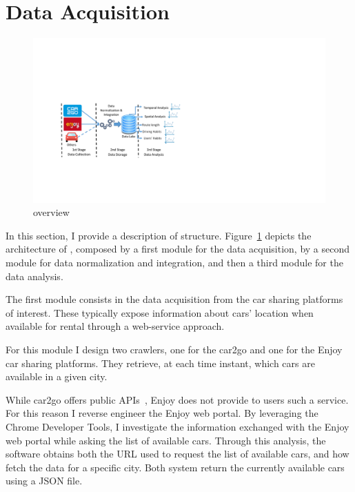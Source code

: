 \section{Data Acquisition}
\label{sec:2_3_data_acquisition}
\begin{figure}[h!]
\centering
 \includegraphics[trim=3cm 4.5cm 17cm 7.2cm,clip, width=0.95\columnwidth]{figures/framework_schema.pdf}
 \caption{\tool overview\label{fig:2_3_c2_framework}}
\end{figure}


In this section, I provide a description of \tool structure. Figure~\ref{fig:2_3_c2_framework} depicts the architecture of \tool, composed by a first module for the data acquisition, by a second module for data normalization and integration, and then a third  module for the data analysis.

The first module consists in the data acquisition from the car sharing platforms of interest. These typically expose information about cars' location when available for rental through a web-service approach. 

For this module I design two crawlers, one for the car2go and one for the Enjoy car sharing platforms. They retrieve, at each time instant, which cars are available in a given city.

While car2go offers public APIs~\cite{car2goAPI}, Enjoy does not provide to users such a service. For this reason I reverse engineer the Enjoy web portal. By leveraging the Chrome Developer Tools, I investigate the information exchanged with the Enjoy web portal while asking the list of available cars. Through this analysis, the software obtains both the URL used to request the list of available cars, and how fetch the data for a specific city.
Both system return the currently available cars using a JSON file.

